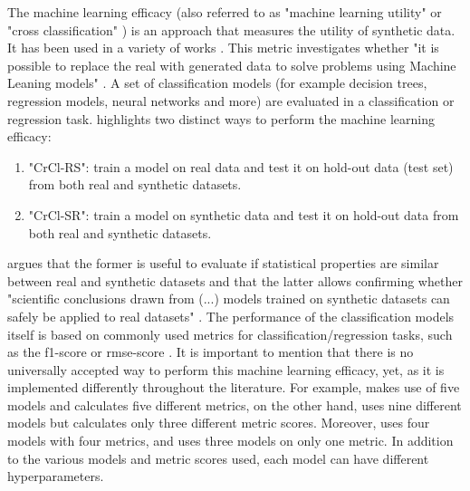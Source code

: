 The machine learning efficacy (also referred to as "machine learning utility" \cite{zhang2021GANBLRTabularData} or "cross classification" \cite{goncalves2020GenerationEvaluationSynthetic}) is an approach that measures the utility of synthetic data. 
It has been used in a variety of works \cite{zhao2022CTABGANEnhancingTabular, xu2019ModelingTabularData, zhang2021GANBLRTabularData, bourou2021ReviewTabularData, ge2021KaminoConstraintawareDifferentially}.
This metric investigates whether "it is possible to replace the real with generated data to solve problems using Machine Leaning models" \cite[p. 7]{bourou2021ReviewTabularData}.
A set of classification models (for example decision trees, regression models, neural networks and more) are evaluated in a classification or regression task.
\cite[p. 7]{goncalves2020GenerationEvaluationSynthetic} highlights two distinct ways to perform the machine learning efficacy:
\begin{enumerate}
  \item "CrCl-RS": train a model on real data and test it on hold-out data (test set) from both real and synthetic datasets.
  \item "CrCl-SR": train a model on synthetic data and test it on hold-out data from both real and synthetic datasets.
\end{enumerate}
\cite{goncalves2020GenerationEvaluationSynthetic} argues that the former is useful to evaluate if statistical properties are similar between real and synthetic datasets
and that the latter allows confirming whether "scientific conclusions drawn from (...) models trained on synthetic datasets can safely be applied to real datasets" \cite[p. 7]{goncalves2020GenerationEvaluationSynthetic}.
The performance of the classification models itself is based on commonly used metrics for classification/regression tasks, such as the f1-score or \gls{rmse}-score \cite{bourou2021ReviewTabularData, chundawat2022UniversalMetricRobust}.
It is important to mention that there is no universally accepted way to perform this machine learning efficacy, yet, as it is implemented differently throughout the literature.
For example, \cite{zhao2022CTABGANEnhancingTabular} makes use of five models and calculates five different metrics, 
\cite{ge2021KaminoConstraintawareDifferentially} on the other hand, uses nine different models but calculates only three different metric scores.
Moreover, \cite{kunar2021DTGANDifferentialPrivatea} uses four models with four metrics, and \cite{kim2021OCTGANNeuralODEbased} uses three models on only one metric.
In addition to the various models and metric scores used, each model can have different hyperparameters.
